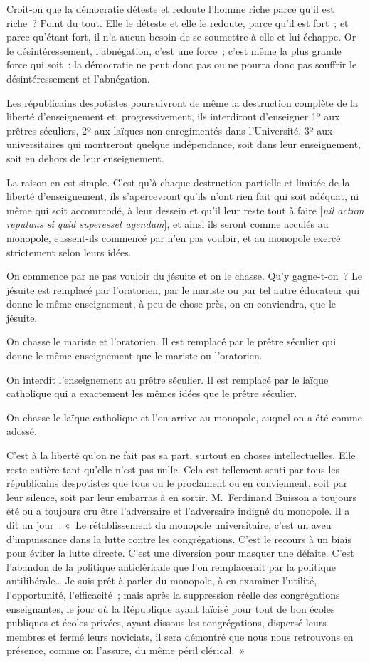 \documentclass[french,twoside]{book} %
\begin{document}
Croit-on que la démocratie déteste et redoute l’homme riche parce qu’il est riche ? Point du tout. Elle le déteste et elle le redoute, parce qu’il est fort ; et parce qu’étant fort, il n’a aucun besoin de se soumettre à elle et lui échappe. Or le désintéressement, l’abnégation, c’est une force ; c’est même la plus grande force qui soit : la démocratie ne peut donc pas ou ne pourra donc pas souffrir le désintéressement et l’abnégation.\par
Les républicains despotistes poursuivront de même la destruction complète de la liberté d’enseignement et, progressivement, ils interdiront d’enseigner 1º aux prêtres séculiers, 2º aux laïques non enregimentés dans l’Université, 3º aux universitaires qui montreront quelque indépendance, soit dans leur enseignement, soit en dehors de leur enseignement.\par
La raison en est simple. C’est qu’à chaque destruction partielle et limitée de la liberté d’enseignement, ils s’apercevront qu’ils n’ont rien fait  qui soit adéquat, ni même qui soit accommodé, à leur dessein et qu’il leur reste tout à faire [{\itshape nil actum reputans si quid superesset agendum}], et ainsi ils seront comme acculés au monopole, eussent-ils commencé par n’en pas vouloir, et au monopole exercé strictement selon leurs idées.\par
On commence par ne pas vouloir du jésuite et on le chasse. Qu’y gagne-t-on ? Le jésuite est remplacé par l’oratorien, par le mariste ou par tel autre éducateur qui donne le même enseignement, à peu de chose près, on en conviendra, que le jésuite.\par
On chasse le mariste et l’oratorien. Il est remplacé par le prêtre séculier qui donne le même enseignement que le mariste ou l’oratorien.\par
On interdit l’enseignement au prêtre séculier. Il est remplacé par le laïque catholique qui a exactement les mêmes idées que le prêtre séculier.\par
On chasse le laïque catholique et l’on arrive au monopole, auquel on a été comme adossé.\par
C’est à la liberté qu’on ne fait pas sa part, surtout en choses intellectuelles. Elle reste entière tant qu’elle n’est pas nulle. Cela est tellement senti par tous les républicains despotistes que tous ou le proclament ou en conviennent, soit par leur silence, soit par leur embarras à en sortir.  M. Ferdinand Buisson a toujours été ou a toujours cru être l’adversaire et l’adversaire indigné du monopole. Il a dit un jour : « Le rétablissement du monopole universitaire, c’est un aveu d’impuissance dans la lutte contre les congrégations. C’est le recours à un biais pour éviter la lutte directe. C’est une diversion pour masquer une défaite. C’est l’abandon de la politique anticléricale que l’on remplacerait par la politique antilibérale… Je suis prêt à parler du monopole, à en examiner l’utilité, l’opportunité, l’efficacité ; mais après la suppression réelle des congrégations enseignantes, le jour où la République ayant laïcisé pour tout de bon écoles publiques et écoles privées, ayant dissous les congrégations, dispersé leurs membres et fermé leurs noviciats, il sera démontré que nous nous retrouvons en présence, comme on l’assure, du même péril clérical. »\par
\end{document}
